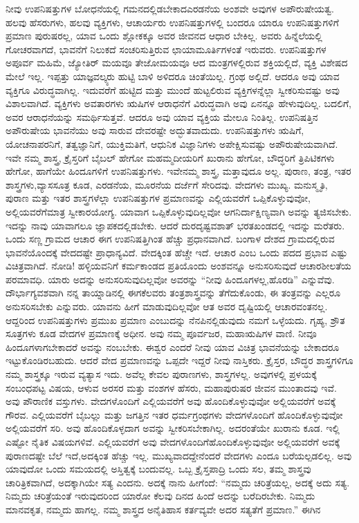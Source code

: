 ನೀವು ಉಪನಿಷತ್ತುಗಳ ಬೋಧನೆಯಲ್ಲಿ ಗಮನದಲ್ಲಿಡಬೇಕಾದ\break ಎರಡನೆಯ ಅಂಶವೇ ಅವುಗಳ ಅಪೌರುಷೇಯತ್ವ. ಹಲವು ಹೆಸರುಗಳು, ಹಲವು ವ್ಯಕ್ತಿಗಳು, ಆಚಾರ್ಯರು ಉಪನಿಷತ್ತುಗಳಲ್ಲಿ ಬಂದರೂ ಯಾರೂ ಉಪನಿಷತ್ತುಗಳಿಗೆ ಪ್ರಮಾಣ ಪುರುಷರಲ್ಲ, ಯಾವ ಒಂದು ಶ್ಲೋಕಕ್ಕೂ ಅವರ ಜೀವನದ ಆಧಾರ ಬೇಕಿಲ್ಲ. ಅವರು ಹಿನ್ನೆಲೆಯಲ್ಲಿ ಗೋಚರವಾಗದೆ, ಭಾವನೆಗೆ ನಿಲುಕದೆ ಸಂಚರಿಸುತ್ತಿರುವ ಛಾಯಾಮೂರ್ತಿಗಳಂತೆ ಇರುವರು. ಉಪನಿಷತ್ತುಗಳ ಅಪೂರ್ವ ಮಹಿಮೆ, ಜ್ಯೋತಿರ್ ಮಯವೂ ತೇಜೋಮಯವೂ ಆದ ಮಂತ್ರಗಳಲ್ಲಿರುವ ಶಕ್ತಿಯಲ್ಲಿದೆ, ವ್ಯಕ್ತಿ ವಿಶೇಷದ ಮೇಲೆ ಇಲ್ಲ. ಇಪ್ಪತ್ತು ಯಾಜ್ಞವಲ್ಕ್ಯರು ಹುಟ್ಟಿ ಬಾಳಿ ಅಳಿದರೂ ಚಿಂತೆಯಿಲ್ಲ. ಗ್ರಂಥ ಅಲ್ಲಿದೆ. ಆದರೂ ಅವು ಯಾವ ವ್ಯಕ್ತಿಗೂ ವಿರುದ್ಧವಾಗಿಲ್ಲ. ಇದುವರೆಗೆ ಹುಟ್ಟಿದ ಮತ್ತು ಮುಂದೆ ಹುಟ್ಟಲಿರುವ ವ್ಯಕ್ತಿಗಳನ್ನೆಲ್ಲಾ ಸ್ವೀಕರಿಸುವಷ್ಟು ಅವು ವಿಶಾಲವಾಗಿದೆ. ವ್ಯಕ್ತಿಗಳು ಅವತಾರಗಳು ಋಷಿಗಳ ಆರಾಧನೆಗೆ ವಿರುದ್ಧವಾಗಿ ಅವು ಏನನ್ನೂ ಹೇಳುವು\-ದಿಲ್ಲ. ಬದಲಿಗೆ, ಅವರ ಆರಾಧನೆಯನ್ನು ಸಮರ್ಥಿಸುತ್ತವೆ. ಆದರೂ ಅವು ಯಾವ ವ್ಯಕ್ತಿಯ ಮೇಲೂ ನಿಂತಿಲ್ಲ. ಉಪನಿಷತ್ತಿನ ಅಪೌರುಷೇಯ ಭಾವನೆಯು ಅವು ಸಾರುವ ದೇವರಷ್ಟೇ ಅದ್ಭುತವಾದುದು. ಉಪನಿಷತ್ತುಗಳು ಋಷಿಗೆ, ಯೋಚನಾಪರನಿಗೆ, ತತ್ವಜ್ಞಾನಿಗೆ, ಯುಕ್ತಿಮತಿಗೆ, ಆಧುನಿಕ ವಿಜ್ಞಾನಿಗಳು ಅಪೇಕ್ಷಿಸುವಷ್ಟು ಅಪೌರುಷೇಯವಾಗಿದೆ. ಇವೇ ನಮ್ಮ ಶಾಸ್ತ್ರ, ಕ್ರೈಸ್ತರಿಗೆ ಬೈಬಲ್​ ಹೇಗೋ ಮಹಮ್ಮದೀಯರಿಗೆ ಖುರಾನು ಹೇಗೋ, ಬೌದ್ಧರಿಗೆ ತ್ರಿಪಿಟಿಕಗಳು ಹೇಗೋ, ಹಾಗೆಯೇ ಹಿಂದೂಗಳಿಗೆ ಉಪನಿಷತ್ತುಗಳು. ಇವೇ\break ನಮ್ಮ ಶಾಸ್ತ್ರ, ಮತ್ತಾವುದೂ ಅಲ್ಲ. ಪುರಾಣ, ತಂತ್ರ, ಇತರ ಶಾಸ್ತ್ರಗಳು,\break ವ್ಯಾಸಸೂತ್ರ ಕೂಡ, ಎರಡನೆಯ, ಮೂರನೆಯ ದರ್ಜೆಗೆ ಸೇರಿದವು. ವೇದಗಳು ಮುಖ್ಯ. ಮನುಸ್ಮೃತಿ, ಪುರಾಣ ಮತ್ತು ಇತರ ಶಾಸ್ತ್ರಗಳೆಲ್ಲಾ ಉಪನಿಷತ್ತುಗಳ ಪ್ರಮಾಣವನ್ನು ಎಲ್ಲಿಯವರೆಗೆ ಒಪ್ಪಿಕೊಳ್ಳುವುವೋ, ಅಲ್ಲಿಯವರೆಗೆ\break ಮಾತ್ರ ಸ್ವೀಕಾರಯೋಗ್ಯ. ಯಾವಾಗ ಒಪ್ಪಿಕೊಳ್ಳುವುದಿಲ್ಲವೋ ಆಗ\break ನಿರ್ದಾಕ್ಷಿಣ್ಯವಾಗಿ ಅವನ್ನು ತ್ಯಜಿಸಬೇಕು. ಇದನ್ನು ನಾವು ಯಾವಾಗಲೂ ಜ್ಞಾಪಕದಲ್ಲಿಡಬೇಕು. ಆದರೆ ದುರದೃಷ್ಟವಶಾತ್​ ಭರತಖಂಡದಲ್ಲಿ ಇದನ್ನು ಮರೆತರು. ಒಂದು ಸಣ್ಣ ಗ್ರಾಮದ ಆಚಾರ ಈಗ ಉಪನಿಷತ್ತಿಗಿಂತ ಹೆಚ್ಚು ಪ್ರಧಾನವಾಗಿದೆ. ಬಂಗಾಳ ದೇಶದ ಗ್ರಾಮದಲ್ಲಿರುವ ಭಾವನೆಯೊಂದಕ್ಕೆ ವೇದದಷ್ಟೇ ಪ್ರಾಧಾನ್ಯವಿದೆ. ವೇದಕ್ಕಿಂತ ಹೆಚ್ಚೇ ಇದೆ. ಆಚಾರ ಎಂಬ ಒಂದು ಪದದ ಪ್ರಭಾವ ಎಷ್ಟು ವಿಚಿತ್ರವಾಗಿದೆ. ನೋಡಿ! ಹಳ್ಳಿಯವನಿಗೆ ಕರ್ಮಕಾಂಡದ ಪ್ರತಿಯೊಂದು ಅಂಶವನ್ನೂ ಅನುಸರಿಸುವುದೆ ಆಚಾರಶೀಲತೆಯ ಪರಮಾವಧಿ. ಯಾರು ಅದನ್ನು ಅನುಸರಿಸುವುದಿಲ್ಲವೋ ಅವರನ್ನು “ನೀವು ಹಿಂದೂಗಳಲ್ಲ,\break ಹೊರಡಿ” ಎನ್ನುವೆವು. ದೌರ್ಭಾಗ್ಯವಶವಾಗಿ ನನ್ನ ತಾಯ್ನಾಡಿನಲ್ಲಿ ಈಗ\break ಕೆಲವರು ತಂತ್ರಶಾಸ್ತ್ರವನ್ನು ತೆಗೆದುಕೊಂಡು, ಈ ತಂತ್ರವನ್ನು ಎಲ್ಲರೂ ಅನುಸರಿಸಬೇಕು ಎನ್ನುವರು. ಯಾವನು ಹೀಗೆ ಮಾಡುವುದಿಲ್ಲವೋ ಆತ ಅವರ ದೃಷ್ಟಿಯಲ್ಲಿ ಆಚಾರವಂತನಲ್ಲ. ಆದ್ದರಿಂದ ಉಪನಿಷತ್ತುಗಳು ಪ್ರಮುಖ ಪ್ರಮಾಣ ಎಂಬುದನ್ನು ನೆನಪಿನಲ್ಲಿಡುವುದು ನಮಗೆ ಒಳ್ಳೆಯದು. ಗೃಹ್ಯ, ಶ್ರೌತ ಸೂತ್ರಗಳು ಕೂಡ ವೇದಗಳ ಪ್ರಮಾಣಕ್ಕೆ ಅಧೀನ. ಅವು ನಮ್ಮ ಪೂರ್ವಜರ, ಮಹಾಋಷಿಗಳ ವಾಣಿ. ನೀವೂ ಹಿಂದೂಗಳಾಗಬೇಕಾದರೆ ಅವನ್ನು ನಂಬಬೇಕು. ಈಶ್ವರ ಎಂದರೆ ನೀವು ಯಾವ ವಿಚಿತ್ರ ಭಾವನೆಯನ್ನು ಬೇಕಾದರೂ ಇಟ್ಟುಕೊಂಡಿರಬಹುದು. ಆದರೆ ವೇದ ಪ್ರಮಾಣವನ್ನು ಒಪ್ಪದೇ ಇದ್ದರೆ ನೀವು ನಾಸ್ತಿಕರು. ಕ್ರೈಸ್ತರ, ಬೌದ್ಧರ ಶಾಸ್ತ್ರಗಳಿಗೂ ನಮ್ಮ ಶಾಸ್ತ್ರಕ್ಕೂ ಇರುವ ವ್ಯತ್ಯಾಸ ಇದು. ಅವೆಲ್ಲ ಕೇವಲ ಪುರಾಣಗಳು, ಶಾಸ್ತ್ರಗಳಲ್ಲ. ಅವುಗಳಲ್ಲಿ ಪ್ರಳಯಕ್ಕೆ ಸಂಬಂಧಪಟ್ಟ ವಿಷಯ, ಆಳುವ ಅರಸರ ಮತ್ತು ವಂಶಗಳ ಹೆಸರು, ಮಹಾಪುರುಷರ ಜೀವನ ಮುಂತಾದವು ಇವೆ. ಅವು ಪೌರಾಣಿಕ ವಸ್ತುಗಳು. ವೇದಗಳೊಂದಿಗೆ ಎಲ್ಲಿಯವರೆಗೆ ಅವು ಹೊಂದಿಕೊಳ್ಳುವುವೋ ಅಲ್ಲಿಯವರೆಗೆ ಅವಕ್ಕೆ ಗೌರವ. ಎಲ್ಲಿಯವರೆಗೆ ಬೈಬಲ್ಲು ಮತ್ತು ಜಗತ್ತಿನ ಇತರ ಧರ್ಮಗ್ರಂಥಗಳು ವೇದಗಳೊಂದಿಗೆ ಹೊಂದಿಕೊಳ್ಳುವುವೋ ಅಲ್ಲಿಯವರೆಗೆ ಸರಿ. ಅವು ಹೊಂದಿಕೊಳ್ಳದಾಗ ಅವನ್ನು ಸ್ವೀಕರಿಸಬೇಕಾಗಿಲ್ಲ. ಅದರಂತೆಯೇ ಖುರಾನು ಕೂಡ. ಇಲ್ಲಿ ಎಷ್ಟೋ ನೈತಿಕ ವಿಷಯಗಳಿವೆ. ಎಲ್ಲಿಯವರೆಗೆ ಅವು ವೇದಗಳೊಂದಿಗೆ\break ಹೊಂದಿಕೊಳ್ಳುವುವೋ ಅಲ್ಲಿಯವರೆಗೆ ಅವಕ್ಕೆ ಪುರಾಣದಷ್ಟೇ ಬೆಲೆ ಇದೆ,\break ಅದಕ್ಕಿಂತ ಹೆಚ್ಚು ಇಲ್ಲ. ಮುಖ್ಯವಾದದ್ದೇನೆಂದರೆ ವೇದಗಳು ಎಂದೂ ಬರೆಯಲ್ಪಡಲಿಲ್ಲ. ಅವು ಯಾವುದೋ ಒಂದು ಸಮಯದಲ್ಲಿ ಅಸ್ತಿತ್ವಕ್ಕೆ ಬಂದುವಲ್ಲ. ಒಬ್ಬ ಕ್ರೈಸ್ತಪಾದ್ರಿ ಒಂದು ಸಲ, ತಮ್ಮ ಶಾಸ್ತ್ರವು ಚಾರಿತ್ರಿಕವಾಗಿದೆ, ಅದಕ್ಕಾಗಿಯೇ ಸತ್ಯ ಎಂದನು. ಅದಕ್ಕೆ ನಾನು ಹೀಗೆಂದೆ: “ನಮ್ಮದು ಚರಿತ್ರೆಯಲ್ಲ, ಅದಕ್ಕೆ ಅದು ಸತ್ಯ. ನಿಮ್ಮದು ಚರಿತ್ರೆಯಂತೆ ಇರುವುದರಿಂದ ಯಾರೋ ಕೆಲವು ದಿನದ ಹಿಂದೆ ಅದನ್ನು ಬರೆದಿರಬೇಕು. ನಿಮ್ಮದು ಮಾನವಕೃತ, ನಮ್ಮದು ಹಾಗಲ್ಲ. ನಮ್ಮ ಶಾಸ್ತ್ರದ ಅನೈತಿಹಾಸ ಕರ್ತವ್ಯವೇ ಅದರ ಸತ್ಯತೆಗೆ ಪ್ರಮಾಣ.” ಈಗಿನ 